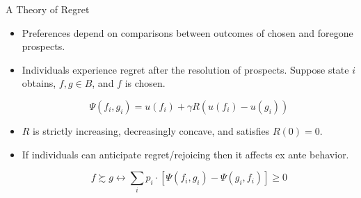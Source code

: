 \documentclass[aspectratio=169]{beamer}
\begin{document}
\begin{frame}{A Theory of Regret}

	\begin{itemize}

		\item Preferences depend on comparisons between outcomes of chosen and foregone prospects.

		\item Individuals experience regret after the resolution of prospects. Suppose state $i$ obtains, $f, g \in B$, and $f$ is chosen.

			\[ \Psi(f_i, g_i) = u(f_i) + \gamma R(u(f_i) - u(g_i)) \]

		\item $R$ is strictly increasing, decreasingly concave, and satisfies $R(0) = 0$.

		\item If individuals can anticipate regret/rejoicing then it affects ex ante behavior.

		\[ f \succsim g \leftrightarrow \sum_i p_{i} \cdot [\Psi(f_i, g_i) - \Psi(g_i, f_i)] \geq 0 \]




	\end{itemize}
	
\end{frame}
\end{document}
